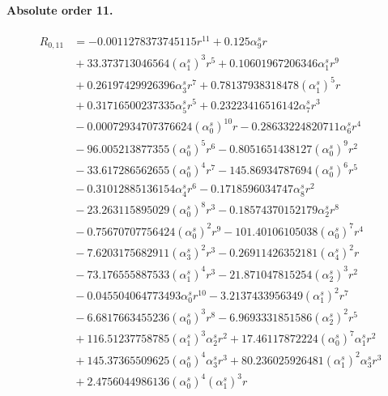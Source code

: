 \documentclass[10pt]{article}
\begin{document}
\paragraph{Absolute order 11.}
\begin{align*}
R_{0,11} &=  - 0.0011278373745115 r^{11} + 0.125 \alpha_{9}^s r \\
&{}  + 33.373713046564 \left(\alpha_{1}^s\right)^{3} r^{5} + 0.10601967206346 \alpha_{1}^s r^{9} \\
&{}  + 0.26197429926396 \alpha_{3}^s r^{7} + 0.78137938318478 \left(\alpha_{1}^s\right)^{5} r \\
&{}  + 0.31716500237335 \alpha_{5}^s r^{5} + 0.23223416516142 \alpha_{7}^s r^{3} \\
&{}  - 0.00072934707376624 \left(\alpha_{0}^s\right)^{10} r - 0.28633224820711 \alpha_{6}^s r^{4} \\
&{}  - 96.005213877355 \left(\alpha_{0}^s\right)^{5} r^{6} - 0.8051651438127 \left(\alpha_{0}^s\right)^{9} r^{2} \\
&{}  - 33.617286562655 \left(\alpha_{0}^s\right)^{4} r^{7} - 145.86934787694 \left(\alpha_{0}^s\right)^{6} r^{5} \\
&{}  - 0.31012885136154 \alpha_{4}^s r^{6} - 0.1718596034747 \alpha_{8}^s r^{2} \\
&{}  - 23.263115895029 \left(\alpha_{0}^s\right)^{8} r^{3} - 0.18574370152179 \alpha_{2}^s r^{8} \\
&{}  - 0.75670707756424 \left(\alpha_{0}^s\right)^{2} r^{9} - 101.40106105038 \left(\alpha_{0}^s\right)^{7} r^{4} \\
&{}  - 7.6203175682911 \left(\alpha_{3}^s\right)^{2} r^{3} - 0.26911426352181 \left(\alpha_{4}^s\right)^{2} r \\
&{}  - 73.176555887533 \left(\alpha_{1}^s\right)^{4} r^{3} - 21.871047815254 \left(\alpha_{2}^s\right)^{3} r^{2} \\
&{}  - 0.045504064773493 \alpha_{0}^s r^{10} - 3.2137433956349 \left(\alpha_{1}^s\right)^{2} r^{7} \\
&{}  - 6.6817663455236 \left(\alpha_{0}^s\right)^{3} r^{8} - 6.9693331851586 \left(\alpha_{2}^s\right)^{2} r^{5} \\
&{}  + 116.51237758785 \left(\alpha_{1}^s\right)^{3} \alpha_{2}^s r^{2} + 17.46117872224 \left(\alpha_{0}^s\right)^{7} \alpha_{1}^s r^{2} \\
&{}  + 145.37365509625 \left(\alpha_{0}^s\right)^{4} \alpha_{3}^s r^{3} + 80.236025926481 \left(\alpha_{1}^s\right)^{2} \alpha_{3}^s r^{3} \\
&{}  + 2.4756044986136 \left(\alpha_{0}^s\right)^{4} \left(\alpha_{1}^s\right)^{3} r \\

\end{align*}
\end{document}
